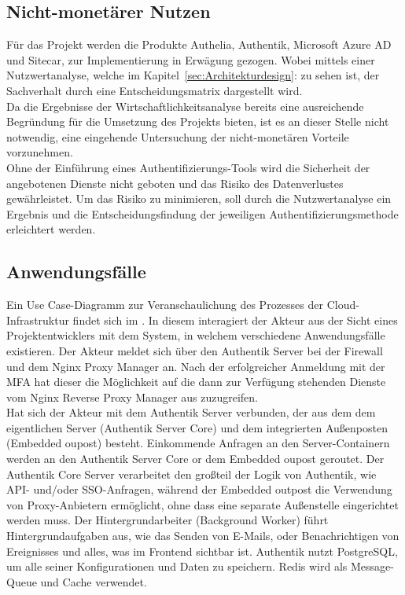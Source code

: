 \subsection{Nicht-monetärer Nutzen}
\label{sec:Nicht-monetärer Nutzen}
Für das Projekt werden die Produkte Authelia, Authentik, Microsoft Azure AD und Sitecar, zur Implementierung in Erwägung gezogen. 
Wobei mittels einer Nutzwertanalyse, welche im Kapitel~\ref{sec:Architekturdesign}:  zu sehen ist, der 
Sachverhalt durch eine Entscheidungsmatrix dargestellt wird.
\\Da die Ergebnisse der Wirtschaftlichkeitsanalyse bereits eine ausreichende Begründung für die Umsetzung des Projekts bieten, 
ist es an dieser Stelle nicht notwendig, eine eingehende Untersuchung der nicht-monetären Vorteile vorzunehmen.
\\Ohne der Einführung eines Authentifizierungs-Tools wird die Sicherheit der angebotenen Dienste nicht geboten und das Risiko des 
Datenverlustes gewährleistet. Um das Risiko zu minimieren, soll durch die Nutzwertanalyse ein Ergebnis und die Entscheidungsfindung 
der jeweiligen Authentifizierungsmethode erleichtert werden.


\subsection{Anwendungsfälle}
\label{sec:Anwendungsfaelle}
Ein Use Case-Diagramm zur Veranschaulichung des Prozesses der Cloud-Infrastruktur findet sich im .
In diesem interagiert der Akteur aus der Sicht eines Projektentwicklers mit dem System, in welchem verschiedene 
Anwendungsfälle existieren. Der Akteur meldet sich über den Authentik Server bei der Firewall und dem Nginx Proxy Manager an. 
Nach der erfolgreicher Anmeldung mit der \acs*{MFA} hat dieser die Möglichkeit auf die dann zur Verfügung stehenden Dienste vom 
Nginx Reverse Proxy Manager aus zuzugreifen.
\\Hat sich der Akteur mit dem Authentik Server verbunden, der aus dem dem eigentlichen Server (Authentik Server Core) und dem 
integrierten Außenposten (Embedded oupost) besteht. Einkommende Anfragen an den Server-Containern werden an den Authentik Server Core 
or dem Embedded oupost geroutet. Der Authentik Core Server verarbeitet den großteil der Logik von Authentik, wie \zB API- und/oder 
SSO-Anfragen, während der Embedded outpost die Verwendung von Proxy-Anbietern ermöglicht, ohne dass eine separate Außenstelle 
eingerichtet werden muss. Der Hintergrundarbeiter (Background Worker) führt Hintergrundaufgaben aus, wie das Senden von E-Mails, 
oder Benachrichtigen von Ereignisses und alles, was im Frontend sichtbar ist. Authentik nutzt PostgreSQL, um alle seiner 
Konfigurationen und Daten zu speichern. Redis wird als Message-Queue und Cache verwendet.